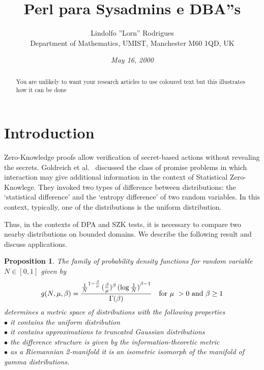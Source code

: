 \documentclass[a4paper,twoside]{article}      %
\date{\small\it May 16, 2000}
\title{Perl para Sysadmins e DBA''s}
\author{ Lindolfo ''Lorn'' Rodrigues \\
{\small Department of Mathematics, UMIST, Manchester M60 1QD, UK}
 }
\newtheorem{proposition}[theorem]{Proposition}
\begin{document}
\maketitle
\begin{abstract}
{\color{red}
You are unlikely to want your research articles to use coloured text
but this illustrates how it can be done}
\end{abstract}

{\color{green}{\sc keywords: dpa, zero-knowledge, information theory,
distributions, metric}}

\section{Introduction}
Zero-Knowledge proofs allow verification of
secret-based actions without revealing the secrets. Goldreich et
al.~\cite{goldreich} discussed the class of promise problems in
which interaction may give additional information in the context
of Statistical Zero-Knowlege. They invoked two types of difference
between distributions: the `statistical difference' and the
`entropy difference' of two random variables. In this context,
typically, one of the distributions is the uniform distribution.

Thus, in the contexts of DPA and SZK tests, it is necessary to
compare two nearby distributions on bounded domains.
We describe the following result and discuss applications.
{\color{cyan}
\begin{proposition}\label{colour}
The family of probability density functions for random variable
$N\in [0,1]$ given by
\begin{equation}
g(N,\mu,\beta) = {\frac{{{{\frac{1}{N}}}^
       {1 - {\frac{\beta }{\mu }}}}\,
     ({{{\frac{\beta }{\mu }}})^{\beta }}\,
     {{(\log {\frac{1}{N}})}^
       { \beta -1}}}{
      \Gamma(\beta )}} \ \ \ {\rm for} \  \mu \  > 0 \ {\rm and} \ \beta \geq 1
  \label{loggamma}    \end{equation}
determines a metric space of distributions with the following
properties\\ $\bullet$ it contains the uniform distribution\\
$\bullet$ it contains approximations to truncated Gaussian
distributions\\ $\bullet$ the difference structure is given by the
information-theoretic metric\\ $\bullet$ as a Riemannian
2-manifold it is an isometric isomorph of the manifold of gamma
distributions.
\end{proposition} }
\end{document}
